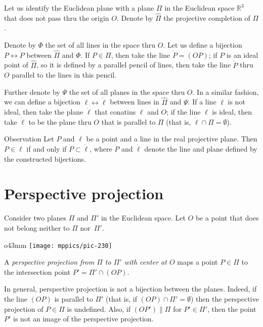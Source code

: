 Let us identify the Euclidean plane with a plane $\Pi$ in the Euclidean space $\mathbb{R}^3$ that does not pass thru the origin $O$.
Denote by $\hat\Pi$ the projective completion of $\Pi$.

Denote by $\Phi$ the set of all lines in the space thru $O$.
Let us define a bijection $P\leftrightarrow \dot P$ between $\hat \Pi$ and $\Phi$.
If $P\in \Pi$, then take the line $\dot P=(OP)$;
if $P$ is an ideal point of $\hat \Pi$, so it is defined by a parallel pencil of lines, then take the line $\dot P$ thru $O$ parallel to the lines in this pencil.

Further denote by $\Psi$ the set of all planes in the space thru $O$.
In a similar fashion, we can define a bijection $\ell\leftrightarrow \dot \ell$ between lines in $\hat \Pi$ and $\Psi$.
If a line $\ell$ is not ideal, then take the plane  $\dot \ell$ that conatins $\ell$ and $O$;
if the line $\ell$ is ideal, then take $\dot \ell$ to be the plane thru $O$ that is parallel to $\Pi$ (that is, $\dot\ell\cap\Pi=\emptyset$).

\begin{thm}{Observation}\label{obs:bijections}
Let $P$ and $\ell$ be a point and a line in the real projective plane.
Then $P\in \ell$ if and only if $\dot P\subset \dot \ell$,
where $\dot P$ and $\dot \ell$ denote the line and plane defined by the constructed bijections.
\end{thm}

\section*{Perspective projection}

Consider two planes $\Pi$ and $\Pi'$ 
in the Euclidean space. 
Let $O$ be a point that does not belong neither to $\Pi$ nor~$\Pi'$.

\begin{wrapfigure}{o}{43mm}
\centering
\texttt{[image: mppics/pic-230]}
\end{wrapfigure}

A \emph{perspective projection from $\Pi$ to $\Pi'$ with center at $O$} maps a point $P\in \Pi$
to the intersection point $P'=\Pi'\cap (OP)$.

In general, perspective projection is not a bijection between the planes.
Indeed, if the line $(OP)$ is parallel to $\Pi'$ 
(that is, if $(OP)\cap\Pi'=\emptyset$)
then the perspective projection of $P\in \Pi$ is undefined.
Also, if $(OP')\parallel \Pi$ 
for $P'\in \Pi'$,
then the point $P'$ is not an image of the perspective projection.

